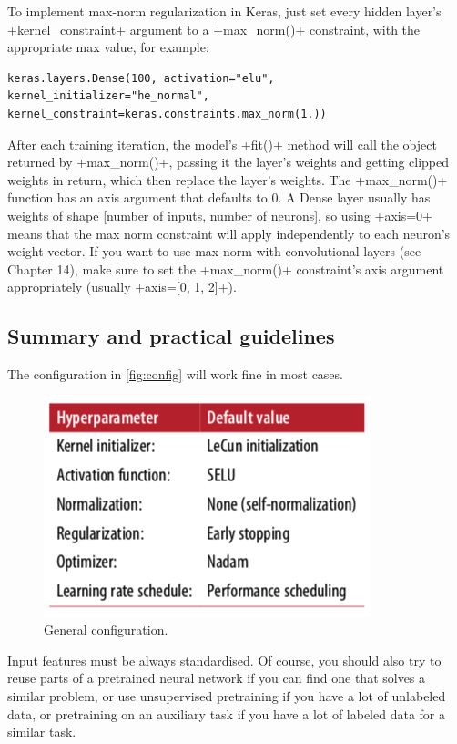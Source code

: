 To implement max-norm regularization in Keras, just set every hidden layer's \cd+kernel_constraint+ argument to a \cd+max_norm()+ constraint, with the appropriate max value, for example:
\begin{lstlisting}
keras.layers.Dense(100, activation="elu", kernel_initializer="he_normal", kernel_constraint=keras.constraints.max_norm(1.))
\end{lstlisting}
After each training iteration, the model's \cd+fit()+ method will call the object returned by \cd+max_norm()+, passing it the layer's weights and getting clipped weights in return, which then replace the layer's weights. The \cd+max_norm()+ function has an axis argument that defaults to $0$. A Dense layer usually has weights of shape [number of inputs, number of neurons], so using \cd+axis=0+ means that the max norm constraint will apply independently to each neuron's weight vector. If you want to use max-norm with convolutional layers (see Chapter 14), make sure to set the \cd+max_norm()+ constraint's axis argument appropriately (usually \cd+axis=[0, 1, 2]+).
\subsection{Summary and practical guidelines}
The configuration in \autoref{fig:config} will work fine in most cases.
\begin{figure}
\centering
\includegraphics[scale=0.6]{img/config}
\caption{General configuration.}
\label{fig:config}
\end{figure}
Input features must be always standardised. Of course, you should also try to reuse parts of a pretrained neural network if you can find one that solves a similar problem, or use unsupervised pretraining if you have a lot of unlabeled data, or pretraining on an auxiliary task if you have a lot of labeled data for a similar task.

